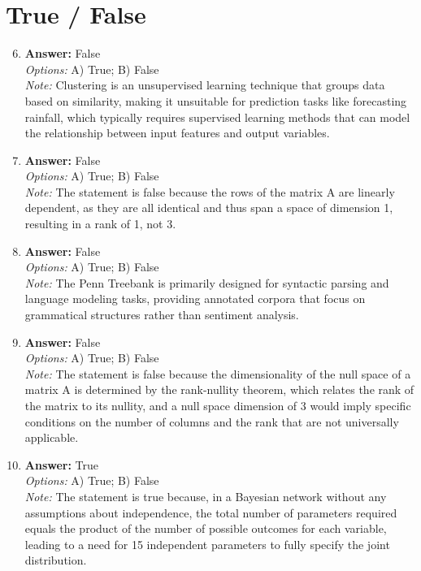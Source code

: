 \documentclass[12pt]{article}
\begin{document}
\section*{True / False}
\begin{enumerate}[label=\arabic*.]
\setcounter{enumi}{5}
\item \textbf{Answer:} False
\\ \textit{Options:} A) True; B) False
\\ \textit{Note:} Clustering is an unsupervised learning technique that groups data based on similarity, making it unsuitable for prediction tasks like forecasting rainfall, which typically requires supervised learning methods that can model the relationship between input features and output variables.
\item \textbf{Answer:} False
\\ \textit{Options:} A) True; B) False
\\ \textit{Note:} The statement is false because the rows of the matrix A are linearly dependent, as they are all identical and thus span a space of dimension 1, resulting in a rank of 1, not 3.
\item \textbf{Answer:} False
\\ \textit{Options:} A) True; B) False
\\ \textit{Note:} The Penn Treebank is primarily designed for syntactic parsing and language modeling tasks, providing annotated corpora that focus on grammatical structures rather than sentiment analysis.
\item \textbf{Answer:} False
\\ \textit{Options:} A) True; B) False
\\ \textit{Note:} The statement is false because the dimensionality of the null space of a matrix A is determined by the rank-nullity theorem, which relates the rank of the matrix to its nullity, and a null space dimension of 3 would imply specific conditions on the number of columns and the rank that are not universally applicable.
\item \textbf{Answer:} True
\\ \textit{Options:} A) True; B) False
\\ \textit{Note:} The statement is true because, in a Bayesian network without any assumptions about independence, the total number of parameters required equals the product of the number of possible outcomes for each variable, leading to a need for 15 independent parameters to fully specify the joint distribution.
\end{enumerate}
\end{document}
